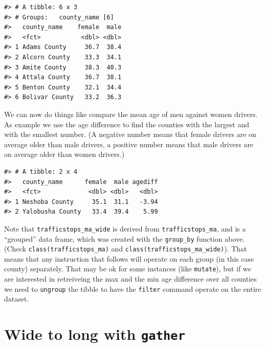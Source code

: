 \documentclass[]{book}
\newenvironment{Shaded}{\begin{snugshade}}{\end{snugshade}}
\newcommand{\KeywordTok}[1]{\textcolor[rgb]{0.13,0.29,0.53}{\textbf{#1}}}
\newcommand{\DataTypeTok}[1]{\textcolor[rgb]{0.13,0.29,0.53}{#1}}
\newcommand{\StringTok}[1]{\textcolor[rgb]{0.31,0.60,0.02}{#1}}
\newcommand{\OperatorTok}[1]{\textcolor[rgb]{0.81,0.36,0.00}{\textbf{#1}}}
\newcommand{\NormalTok}[1]{#1}
\theoremstyle{definition}
\theoremstyle{definition}
\theoremstyle{definition}
\theoremstyle{remark}
\begin{document}
\begin{verbatim}
#> # A tibble: 6 x 3
#> # Groups:   county_name [6]
#>   county_name    female  male
#>   <fct>           <dbl> <dbl>
#> 1 Adams County     36.7  38.4
#> 2 Alcorn County    33.3  34.1
#> 3 Amite County     38.3  40.3
#> 4 Attala County    36.7  38.1
#> 5 Benton County    32.1  34.4
#> 6 Bolivar County   33.2  36.3
\end{verbatim}

We can now do things like compare the mean age of men against women
drivers. As example we use the age difference to find the counties with
the largest and with the smallest number. (A negative number means that
female drivers are on average older than male drivers, a positive number
means that male drivers are on average older than women drivers.)

\begin{Shaded}
\end{Shaded}

\begin{verbatim}
#> # A tibble: 2 x 4
#>   county_name      female  male agediff
#>   <fct>             <dbl> <dbl>   <dbl>
#> 1 Neshoba County     35.1  31.1   -3.94
#> 2 Yalobusha County   33.4  39.4    5.99
\end{verbatim}

Note that \texttt{trafficstops\_ma\_wide} is derived from
\texttt{trafficstops\_ma}, and is a ``grouped'' data frame, which was
created with the \texttt{group\_by} function above. (Check
\texttt{class(trafficstops\_ma)} and
\texttt{class(trafficstops\_ma\_wide)}). That means that any instruction
that follows will operate on each group (in this case county)
separately. That may be ok for some instances (like \texttt{mutate}),
but if we are interested in retreiveing the max and the min age
difference over all counties we need to \texttt{ungroup} the tibble to
have the \texttt{filter} command operate on the entire dataset.

\section{\texorpdfstring{Wide to long with
\texttt{gather}}{Wide to long with gather}}\label{wide-to-long-with-gather}
\end{document}
